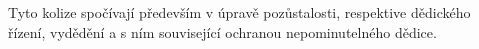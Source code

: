 \documentclass{article}
\begin{document}

Tyto kolize spočívají především v úpravě pozůstalosti, respektive dědického řízení, vydědění a s ním související ochranou nepominutelného dědice.\\






\end{document}
